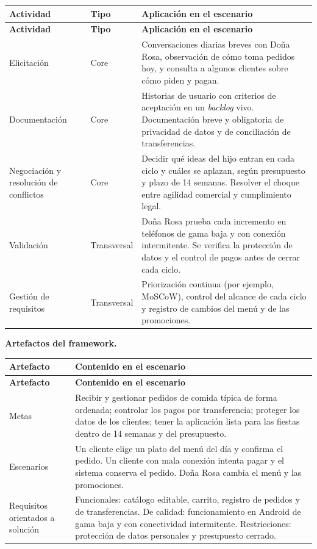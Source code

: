\documentclass[12pt,a4paper]{article}
\begin{document}
{\small
\setlength{\tabcolsep}{4pt}
\renewcommand{\arraystretch}{1.3}
\begin{longtable}{
|>{\raggedright\arraybackslash}p{}
|>{\raggedright\arraybackslash}p{}
|>{\raggedright\arraybackslash}p{}|}
\hline
\textbf{Actividad} & \textbf{Tipo} & \textbf{Aplicación en el escenario} \\
\hline
\endfirsthead
\hline
\textbf{Actividad} & \textbf{Tipo} & \textbf{Aplicación en el escenario} \\
\hline
\endhead
Elicitación & Core & Conversaciones diarias breves con Doña Rosa, observación de cómo toma pedidos hoy, y consulta a algunos clientes sobre cómo piden y pagan. \\
\hline
Documentación & Core & Historias de usuario con criterios de aceptación en un \textit{backlog} vivo. Documentación breve y obligatoria de privacidad de datos y de conciliación de transferencias. \\
\hline
Negociación y resolución de conflictos & Core & Decidir qué ideas del hijo entran en cada ciclo y cuáles se aplazan, según presupuesto y plazo de 14 semanas. Resolver el choque entre agilidad comercial y cumplimiento legal. \\
\hline
Validación & Transversal & Doña Rosa prueba cada incremento en teléfonos de gama baja y con conexión intermitente. Se verifica la protección de datos y el control de pagos antes de cerrar cada ciclo. \\
\hline
Gestión de requisitos & Transversal & Priorización continua (por ejemplo, MoSCoW), control del alcance de cada ciclo y registro de cambios del menú y de las promociones. \\
\hline
\end{longtable}
}

\textbf{Artefactos del framework.}

{\small
\setlength{\tabcolsep}{4pt}
\renewcommand{\arraystretch}{1.3}
\begin{longtable}{
|>{\raggedright\arraybackslash}p{}
|>{\raggedright\arraybackslash}p{}|}
\hline
\textbf{Artefacto} & \textbf{Contenido en el escenario} \\
\hline
\endfirsthead
\hline
\textbf{Artefacto} & \textbf{Contenido en el escenario} \\
\hline
\endhead
Metas & Recibir y gestionar pedidos de comida típica de forma ordenada; controlar los pagos por transferencia; proteger los datos de los clientes; tener la aplicación lista para las fiestas dentro de 14 semanas y del presupuesto. \\
\hline
Escenarios & Un cliente elige un plato del menú del día y confirma el pedido. Un cliente con mala conexión intenta pagar y el sistema conserva el pedido. Doña Rosa cambia el menú y las promociones. \\
\hline
Requisitos orientados a solución & Funcionales: catálogo editable, carrito, registro de pedidos y de transferencias. De calidad: funcionamiento en Android de gama baja y con conectividad intermitente. Restricciones: protección de datos personales y presupuesto cerrado. \\
\hline
\end{longtable}
}
\end{document}
